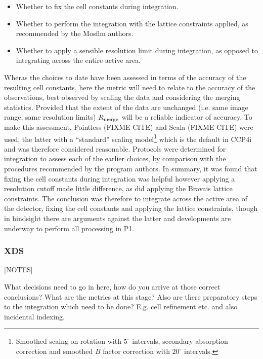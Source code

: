 \documentclass[a4paper,11pt]{article}
\begin{document}
\begin{itemize}
\item{Whether to fix the cell constants during integration.}
\item{Whether to perform the integration with the lattice constraints
    applied, as recommended by the Mosflm authors.}
\item{Whether to apply a sensible resolution limit during integration,
    as opposed to integrating across the entire active area.}
\end{itemize}

Wheras the choices to date have been assessed in terms of the accuracy
of the resulting cell constants, here the metric will need to relate
to the accuracy of the observations, best observed by scaling the data
and considering the merging statistics. Provided that the extent of
the data are unchanged (i.e. same image range, same resolution limits)
$R_{\rm{merge}}$ will be a reliable indicator of accuracy. To make
this assessment, Pointless (FIXME CITE) and Scala (FIXME CITE) were
used, the latter with a ``standard'' scaling model\footnote{Smoothed
  scaing on rotation with $5^{\circ}$ intervals, secondary absorption
  correction and smoothed $B$ factor correction with $20^{\circ}$
  intervals.}
which is the default in CCP4i and was therefore considered
reasonable. Protocols were determined for integration to assess each
of the earlier choices, by comparison with the procedures recommended
by the program authors. In summary, it was found that fixing the cell
constants during integration was helpful however applying a resolution
cutoff made little difference, as did applying the Bravais lattice
constraints. The conclusion was therefore to integrate across the
active area of the detector, fixing the cell constants and applying
the lattice constraints, though in hindsight there are arguments
against the latter and developments are underway to perform all
processing in P1.

\subsubsection{XDS}





[NOTES]

What decisions need to go in here, how do you arrive at those correct
conclusions? What are the metrics at this stage? Also are there
preparatory steps to the integration which need to be done? E.g. cell
refinement etc. and also incidental indexing.
\end{document}
